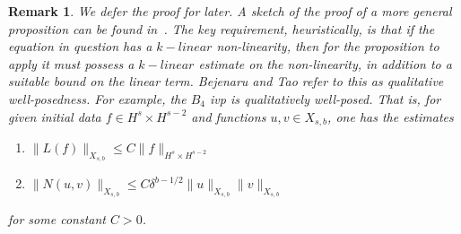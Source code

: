 \documentclass[12pt,reqno]{amsart}
\numberwithin{equation}{section}  %
\newtheorem{remark}[theorem]{Remark}
\begin{document}
%
%
%
%
\begin{framed}
%
%
\begin{remark}
  We defer the proof for later.  A sketch of the proof of a more general
  proposition can be found
  in~\cite{Bejenaru-Tao-2006-Sharp-well-posedness-and-ill-posedness}. The key
  requirement, heuristically, is that if the equation in question
  has a $k-linear$ non-linearity, then for the proposition to apply
  it must possess a $k-linear$ estimate on the non-linearity, in addition
  to a suitable bound on the linear term. Bejenaru and Tao refer to this as
  \emph{qualitative well-posedness}. For example, the $B_{4}$ ivp is qualitatively
  well-posed. That is, for given initial data $f \in H^{s} \times H^{s-2}$ and
  functions $u,v \in X_{s,b}$, one has the estimates
\begin{enumerate}
  \item{$\|L(f)\|_{X_{s,b}} \le C \| f \|_{H^s \times H^{s-2}}$}
  \item{$\| N(u, v) \|_{X_{s,b}} \le C \delta^{b - 1/2} \| u \|_{X_{s,b}} \| v \|_{X_{s,b}}$} 
\end{enumerate}
for some constant $C > 0$.
%
%
\label{rem:qual-wp}
\end{remark}
%
%
\end{framed}
%
%
%
\end{document}
